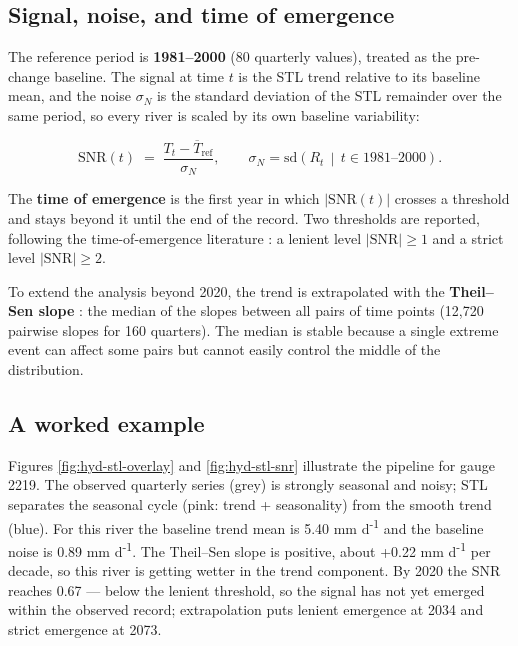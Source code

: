 \documentclass[
]{krantz}
\begin{document}
\subsection{Signal, noise, and time of emergence}\label{signal-noise-and-time-of-emergence}

The reference period is \textbf{1981--2000} (80 quarterly values), treated as the pre-change baseline. The signal at time \(t\) is the STL trend relative to its baseline mean, and the noise \(\sigma_N\) is the standard deviation of the STL remainder over the same period, so every river is scaled by its own baseline variability:

\[
\mathrm{SNR}(t) \;=\; \frac{T_t - \overline{T}_{\mathrm{ref}}}{\sigma_N},
\qquad
\sigma_N = \mathrm{sd}\!\left(R_t \,\middle|\, t \in \text{1981–2000}\right).
\]

The \textbf{time of emergence} is the first year in which \(|\mathrm{SNR}(t)|\) crosses a threshold and stays beyond it until the end of the record. Two thresholds are reported, following the time-of-emergence literature \citep{hawkins2012}: a lenient level \(|\mathrm{SNR}| \ge 1\) and a strict level \(|\mathrm{SNR}| \ge 2\).

To extend the analysis beyond 2020, the trend is extrapolated with the \textbf{Theil--Sen slope} \citep{sen1968}: the median of the slopes between all pairs of time points (12,720 pairwise slopes for 160 quarters). The median is stable because a single extreme event can affect some pairs but cannot easily control the middle of the distribution.

\subsection{A worked example}\label{a-worked-example}

Figures \ref{fig:hyd-stl-overlay} and \ref{fig:hyd-stl-snr} illustrate the pipeline for gauge 2219. The observed quarterly series (grey) is strongly seasonal and noisy; STL separates the seasonal cycle (pink: trend + seasonality) from the smooth trend (blue). For this river the baseline trend mean is 5.40 mm d\textsuperscript{-1} and the baseline noise is 0.89 mm d\textsuperscript{-1}. The Theil--Sen slope is positive, about +0.22 mm d\textsuperscript{-1} per decade, so this river is getting wetter in the trend component. By 2020 the SNR reaches 0.67 --- below the lenient threshold, so the signal has not yet emerged within the observed record; extrapolation puts lenient emergence at 2034 and strict emergence at 2073.
\end{document}
